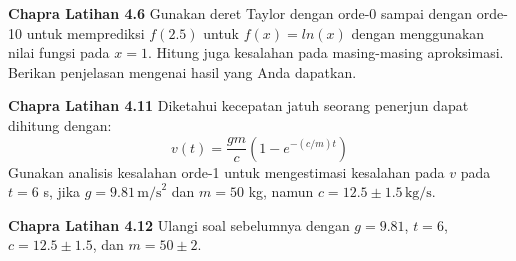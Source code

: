 \begin{soal}
\textbf{Chapra Latihan 4.6}
Gunakan deret Taylor dengan orde-0 sampai dengan orde-10 untuk memprediksi
$f(2.5)$ untuk $f(x) = ln(x)$ dengan menggunakan nilai fungsi pada $x=1$.
Hitung juga kesalahan pada masing-masing aproksimasi. Berikan penjelasan mengenai hasil
yang Anda dapatkan.
\end{soal}

\begin{soal}
\textbf{Chapra Latihan 4.11}
Diketahui kecepatan jatuh seorang penerjun dapat dihitung dengan:
\begin{equation*}
v(t) = \frac{gm}{c}(1 - e^{-(c/m)t})
\end{equation*}
Gunakan analisis kesalahan orde-1 untuk mengestimasi kesalahan pada $v$ pada $t=6$ s,
jika $g = 9.81\,\mathrm{m/s}^{2}$ dan $m=50$ kg, namun
$c = 12.5 \pm 1.5 \, \mathrm{kg/s}$.
\end{soal}

\begin{soal}
\textbf{Chapra Latihan 4.12}
Ulangi soal sebelumnya dengan $g = 9.81$, $t = 6$, $c = 12.5 \pm 1.5$,
dan $m = 50 \pm 2$.
\end{soal}


